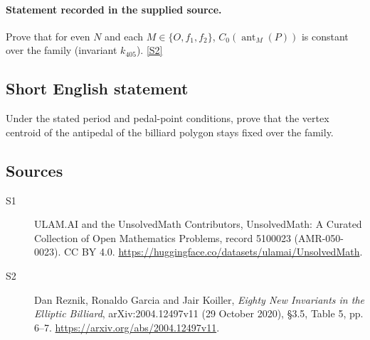 \documentclass[11pt]{article}
\newcommand{\sref}[2]{\hyperlink{source:#1:#2}{[S#2]}}
\begin{document}
\paragraph{Statement recorded in the supplied source.}
Prove that for even $N$ and each $M\in\{O,f_1,f_2\}$, $C_0(\operatorname{ant}_M(P))$ is constant over the family (invariant $k_{405}$). \sref{5100023}{2}
\subsection{Short English statement}
Under the stated period and pedal-point conditions, prove that the vertex centroid of the antipedal of the billiard polygon stays fixed over the family.
\subsection{Sources}
\begin{description}
\item[\hypertarget{source:5100023:1}{S1}] ULAM.AI and the UnsolvedMath Contributors, UnsolvedMath: A Curated Collection of Open Mathematics Problems, record 5100023 (AMR-050-0023). CC BY 4.0. \url{https://huggingface.co/datasets/ulamai/UnsolvedMath}.
\item[\hypertarget{source:5100023:2}{S2}] Dan Reznik, Ronaldo Garcia and Jair Koiller, \emph{Eighty New Invariants in the Elliptic Billiard}, arXiv:2004.12497v11 (29 October 2020), \S3.5, Table 5, pp. 6--7. \url{https://arxiv.org/abs/2004.12497v11}.
\end{description}
\label{end:5100023}
\end{document}
